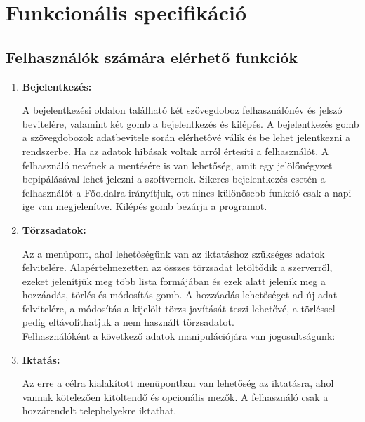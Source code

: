 \documentclass[
]{thesis-ekf}
\theoremstyle{definition}
\theoremstyle{remark}
\begin{document}
\section{Funkcionális specifikáció}
\subsection{Felhasználók számára elérhető funkciók}
\begin{enumerate}[leftmargin=0pt]
	\item \textbf{Bejelentkezés:}
	
A bejelentkezési oldalon található két szövegdoboz felhasználónév és jelszó bevitelére, valamint két gomb a bejelentkezés és kilépés. A bejelentkezés gomb a szövegdobozok adatbevitele során elérhetővé válik és be lehet jelentkezni a rendszerbe. Ha az adatok hibásak voltak arról értesíti a felhasználót. A felhasználó nevének a mentésére is van lehetőség, amit egy jelölőnégyzet bepipálásával lehet jelezni a szoftvernek. Sikeres bejelentkezés esetén a felhasználót a Főoldalra irányítjuk, ott nincs különösebb funkció csak a napi ige van megjelenítve. Kilépés gomb bezárja a programot.	
	
	\item \textbf{Törzsadatok:}
	
Az a menüpont, ahol lehetőségünk van az iktatáshoz szükséges adatok felvitelére. Alapértelmezetten az összes törzsadat letöltődik a szerverről, ezeket jelenítjük meg több lista formájában és ezek alatt jelenik meg a hozzáadás, törlés és módosítás gomb. A hozzáadás lehetőséget ad új adat felvitelére, a módosítás a kijelölt törzs javítását teszi lehetővé, a törléssel pedig eltávolíthatjuk a nem használt törzsadatot. \\Felhasználóként a következő adatok manipulációjára van jogosultságunk: 

	\item \textbf{Iktatás:}

Az erre a célra kialakított menüpontban van lehetőség az iktatásra, ahol vannak kötelezően kitöltendő és opcionális mezők. A felhasználó csak a hozzárendelt telephelyekre iktathat.


\end{enumerate}
\end{document}
